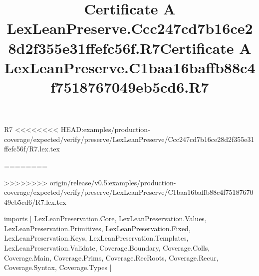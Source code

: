 \begin{lexlean}{R7}
<<<<<<<< HEAD:examples/production-coverage/expected/verify/preserve/LexLeanPreserve/Ccc247cd7b16ce28d2f355e31ffefc56f/R7.lex.tex
\title{Certificate A LexLeanPreserve.Ccc247cd7b16ce28d2f355e31ffefc56f.R7}
========
\title{Certificate A LexLeanPreserve.C1baa16baffb88c4f7518767049eb5cd6.R7}
>>>>>>>> origin/release/v0.5:examples/production-coverage/expected/verify/preserve/LexLeanPreserve/C1baa16baffb88c4f7518767049eb5cd6/R7.lex.tex
\begin{coremodule}
imports [
  LexLeanPreservation.Core,
  LexLeanPreservation.Values,
  LexLeanPreservation.Primitives,
  LexLeanPreservation.Fixed,
  LexLeanPreservation.Keys,
  LexLeanPreservation.Templates,
  LexLeanPreservation.Validate,
  Coverage.Boundary,
  Coverage.Colls,
  Coverage.Main,
  Coverage.Prims,
  Coverage.RecRoots,
  Coverage.Recur,
  Coverage.Syntax,
  Coverage.Types
]


\end{coremodule}
\end{lexlean}
